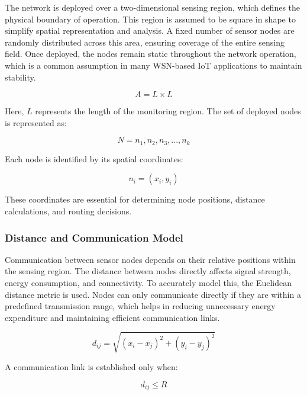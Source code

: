 \documentclass[a4paper,fleqn]{cas-dc}
\numberwithin{equation}{section}
\begin{document}
The network is deployed over a two-dimensional sensing region, which defines the physical boundary of operation. This region is assumed to be square in shape to simplify spatial representation and analysis. A fixed number of sensor nodes are randomly distributed across this area, ensuring coverage of the entire sensing field. Once deployed, the nodes remain static throughout the network operation, which is a common assumption in many WSN-based IoT applications to maintain stability.

\begin{equation}
A = L \times L
\label{eq:4.1}
\end{equation}

Here, $L$ represents the length of the monitoring region. The set of deployed nodes is represented as:

\begin{equation}
N = {n_1, n_2, n_3, ..., n_k}
\label{eq:4.2}
\end{equation}

Each node is identified by its spatial coordinates:

\begin{equation}
n_i = (x_i, y_i)
\label{eq:4.3}
\end{equation}

These coordinates are essential for determining node positions, distance calculations, and routing decisions.

\subsubsection{Distance and Communication Model}

Communication between sensor nodes depends on their relative positions within the sensing region. The distance between nodes directly affects signal strength, energy consumption, and connectivity. To accurately model this, the Euclidean distance metric is used. Nodes can only communicate directly if they are within a predefined transmission range, which helps in reducing unnecessary energy expenditure and maintaining efficient communication links.

\begin{equation}
d_{ij} = \sqrt{(x_i - x_j)^2 + (y_i - y_j)^2}
\label{eq:4.4}
\end{equation}

A communication link is established only when:

\begin{equation}
d_{ij} \leq R
\label{eq:4.5}
\end{equation}
\end{document}

